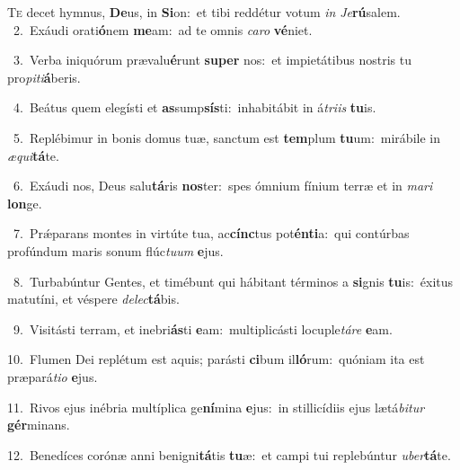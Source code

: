 \lettrine{\initial\textcolor{\initialcolor}{T}}{e} decet hymnus, \textbf{De}\-us, in \textbf{Si}\-on:~\star et tibi reddétur votum \textit{in} \textit{Je}\-\textbf{rú}salem.\\
{\numbfont\textcolor{\numbcolor}{~2.}}~Exáudi orati\-\textbf{ó}\-nem \textbf{me}\-am:~\star ad te omnis \textit{ca}\-\textit{ro} \textbf{vé}\-niet.\par
{\numbfont\textcolor{\numbcolor}{~3.}}~Verba iniquórum prævalu\-\textbf{é}\-runt \textbf{su}\-\textbf{per} nos:~\star et impietátibus nostris tu pro\-\textit{pi}\-\textit{ti}\textbf{á}beris.\par
{\numbfont\textcolor{\numbcolor}{~4.}}~Beátus quem elegísti et \textbf{as}\-sump\-\textbf{sís}\-ti:~\star inhabitábit in á\-\textit{tri}\-\textit{is} \textbf{tu}\-is.\par
{\numbfont\textcolor{\numbcolor}{~5.}}~Replébimur in bonis domus tuæ, sanctum est \textbf{tem}\-plum \textbf{tu}\-um:~\star mirábile in \textit{æ}\-\textit{qui}\textbf{tá}te.\par
{\numbfont\textcolor{\numbcolor}{~6.}}~Exáudi nos, Deus salu\-\textbf{tá}\-ris \textbf{nos}\-ter:~\star spes ómnium fínium terræ et in \textit{ma}\-\textit{ri} \textbf{lon}\-ge.\par
{\numbfont\textcolor{\numbcolor}{~7.}}~Prǽparans montes in virtúte tua, ac\-\textbf{cínc}\-tus pot\-\textbf{én}\-\textbf{ti}a:~\star qui contúrbas profúndum maris sonum flúc\-\textit{tu}\-\textit{um} \textbf{e}\-jus.\par
{\numbfont\textcolor{\numbcolor}{~8.}}~Turbabúntur Gentes, et timébunt qui hábitant términos a \textbf{si}\-gnis \textbf{tu}\-is:~\star éxitus matutíni, et véspere \textit{de}\-\textit{lec}\textbf{tá}bis.\par
{\numbfont\textcolor{\numbcolor}{~9.}}~Visitásti terram, et inebri\-\textbf{ás}\-ti \textbf{e}\-am:~\star multiplicásti locuple\-\textit{tá}\-\textit{re} \textbf{e}\-am.\par
{\numbfont\textcolor{\numbcolor}{10.}}~Flumen Dei replétum est aquis; parásti \textbf{ci}\-bum il\-\textbf{ló}\-rum:~\star quóniam ita est præpará\-\textit{ti}\-\textit{o} \textbf{e}\-jus.\par
{\numbfont\textcolor{\numbcolor}{11.}}~Rivos ejus inébria multíplica ge\-\textbf{ní}\-mina \textbf{e}\-jus:~\star in stillicídiis ejus lætá\-\textit{bi}\-\textit{tur} \textbf{gér}\-minans.\par
{\numbfont\textcolor{\numbcolor}{12.}}~Benedíces corónæ anni benigni\-\textbf{tá}\-tis \textbf{tu}\-æ:~\star et campi tui replebúntur \textit{u}\-\textit{ber}\textbf{tá}te.\par

